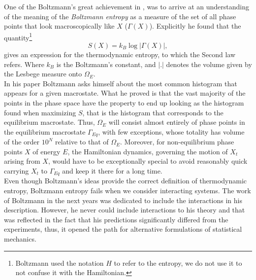 \indent One of the Boltzmann's great achievement in  \cite{boltzmann1871prioritat}, was to arrive at an understanding of the meaning of the \textit{Boltzmann entropy} as a measure of the set of all phase points that look macroscopically like $X$ ($\Gamma(X)$). Explicitly he found that the quantity\footnote{Boltzmann used the notation $H$ to refer to the entropy, we do not use it to not confuse it with the Hamiltonian. }
\begin{equation}
S(X)= k_{B} \log |\Gamma(X)|,
\label{CH1:Boltzmann_entropy}
\end{equation}
gives an expression for the thermodynamic entropy, to which the Second law refers. Where $k_B$ is the Boltzmann's constant, and $|.|$ denotes the volume given by the Lesbege measure onto $\Omega_E$.\\
\indent In his paper \cite{boltzmann1871prioritat} Boltzmann asks himself about the most common histogram that appears for a given macrostate. What he proved is that the vast majority of the points in the phase space have the property to end up looking as the histogram found when maximizing $S$, that is the histogram that corresponds to the equilibrium macrostate. Thus, $\Omega_E$ will consist almost entirely of phase points in the equilibrium macrostate $\Gamma_{Eq}$, with few exceptions, whose totality has volume of the order $10^N$ relative to that of $\Omega_E$. Moreover, for non-equilibrium phase points $X$ of energy $E$, the Hamiltonian dynamics, governing the motion of $X_t$ arising from $X$, would have to be exceptionally special to avoid reasonably quick carrying $X_t$ to $\Gamma_{Eq}$ and keep it there for a long time. \\
\indent Even though Boltzmann's ideas provide the correct definition of thermodynamic entropy, Boltzmann entropy fails when we consider interacting systems\cite{garrido_boltzmann_2004, goldstein_boltzmann_2004 }. The work of Boltzmann in the next years \cite{boltzmann1866mechanische, boltzmann1877beziehung} was dedicated to include the interactions in his description. However, he never could include interactions to his theory and that was reflected in the fact that his predictions significantly differed from the experiments, thus, it opened the path for alternative formulations of statistical mechanics.
